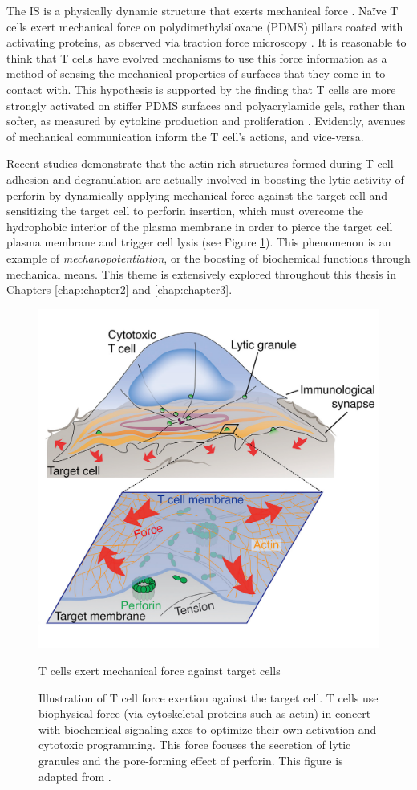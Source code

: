 The IS is a physically dynamic structure that exerts mechanical force \cite{Ritter2015, Bashour2014}. Naïve T cells exert mechanical force on polydimethylsiloxane (PDMS) pillars coated with activating proteins, as observed via traction force microscopy \cite{Bashour2014}. It is reasonable to think that T cells have evolved mechanisms to use this force information as a method of sensing the mechanical properties of surfaces that they come in to contact with. This hypothesis is supported by the finding that T cells are more strongly activated on stiffer PDMS surfaces and polyacrylamide gels, rather than softer, as measured by cytokine production and proliferation \cite{Connor2012}. Evidently, avenues of mechanical communication inform the T cell's actions, and vice-versa.

Recent studies demonstrate that the actin-rich structures formed during T cell adhesion and degranulation are actually involved in boosting the lytic activity of perforin by dynamically applying mechanical force against the target cell \cite{Basu2016, Tamzalit2018} and sensitizing the target cell to perforin insertion, which must overcome the hydrophobic interior of the plasma membrane in order to pierce the target cell plasma membrane and trigger cell lysis (see Figure \ref{fig:mechforce}). This phenomenon is an example of \textit{mechanopotentiation}, or the boosting of biochemical functions through mechanical means. This theme is extensively explored throughout this thesis in Chapters \ref{chap:chapter2} and \ref{chap:chapter3}.

\begin{figure}[htbp]
	\centering
	\includegraphics[width=0.8\columnwidth]{../figures/chapter1/mechforce.png}
	\caption{T cells exert mechanical force against target cells}
	\caption*{Illustration of T cell force exertion against the target cell. T cells use biophysical force (via cytoskeletal proteins such as actin) in concert with biochemical signaling axes to optimize their own activation and cytotoxic programming. This force focuses the secretion of lytic granules and the pore-forming effect of perforin. This figure is adapted from \cite{Rak2011}.}
	\label{fig:mechforce}
\end{figure}

